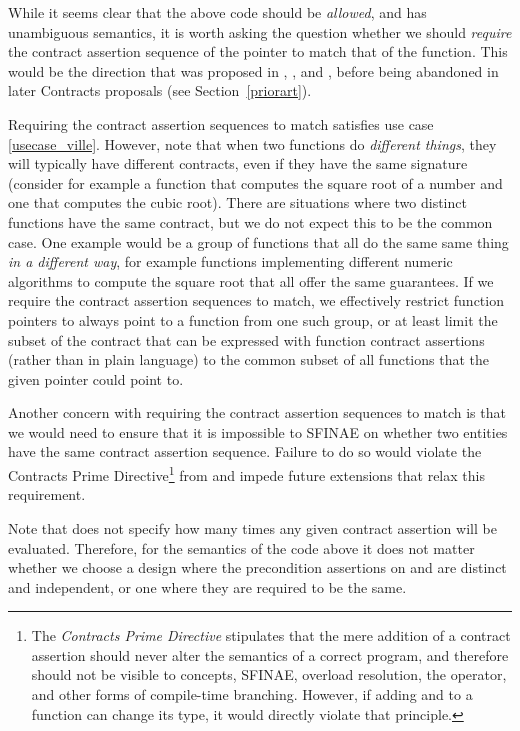 While it seems clear that the above code should be \emph{allowed}, and has unambiguous semantics, it is worth asking the question whether we should \emph{require} the contract assertion sequence of the pointer to match that of the function. This would be the direction that was proposed in \cite{N4415}, \cite{P0287R0}, and \cite{P0380R0}, before being abandoned in later Contracts proposals (see Section~\ref{priorart}).

Requiring the contract assertion sequences to match satisfies use case \ref{usecase_ville}. However, note that when two functions do \emph{different things}, they will typically have different contracts, even if they have the same signature (consider for example a function that computes the square root of a number and one that computes the cubic root). There are situations where two distinct functions have the same contract, but we do not expect this to be the common case. One example would be a group of functions that all do the same same thing \emph{in a different way}, for example functions implementing different numeric algorithms to compute the square root that all offer the same guarantees. If we require the contract assertion sequences to match, we effectively restrict function pointers to always point to a function from one such group, or at least limit the subset of the contract that can be expressed with function contract assertions (rather than in plain language) to the common subset of all functions that the given pointer could point to.

Another concern with requiring the contract assertion sequences to match is that we would need to ensure that it is impossible to SFINAE on whether two entities have the same contract assertion sequence. Failure to do so would violate the Contracts Prime Directive\footnote{The \emph{Contracts Prime Directive} stipulates that the mere addition of a contract assertion should never alter the semantics of a correct program, and therefore should not be visible to concepts, SFINAE, overload resolution, the  operator, and other forms of compile-time branching. However, if adding  and  to a function can change its type, it would directly violate that principle.} from \cite{P2900R8} and impede future extensions that relax this requirement.

Note that \cite{P2900R8} does not specify how many times any given contract assertion will be evaluated. Therefore, for the semantics of the code above it does not matter whether we choose a design where the precondition assertions on  and  are distinct and independent, or one where they are required to be the same.

